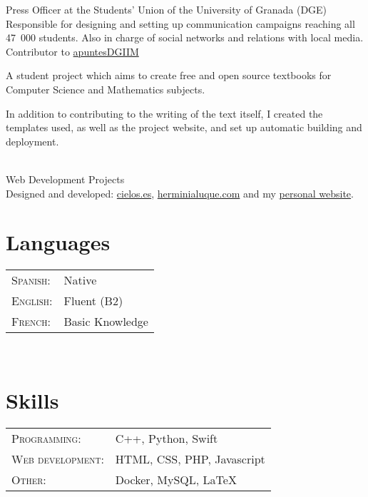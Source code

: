 \documentclass[11pt]{article} %
\begin{document}
 Press Officer at the Students' Union of the University of Granada (DGE)\\
{\color{gray} Responsible for designing and setting up communication campaigns reaching all 47~000 students. Also in charge of social networks and relations with local media.}\\

Contributor to \href{https://github.com/libreim/apuntesdgiim}{apuntesDGIIM}\\ 
{\color{gray} A student project which aims to create free and open source textbooks for Computer Science and Mathematics subjects. 

In addition to contributing to the writing of the text itself, I created the templates used, as well as the project website, and set up automatic building and deployment.}\\

Web Development Projects\\
{\color{gray} Designed and developed: \href{https://cielos.es}{cielos.es}, \href{https://herminialuque.com}{herminialuque.com} and my \href{https://jmml.me}{personal website}.}\\

\vspace{1cm}

\begin{minipage}[t]{0.5\textwidth}
	\section*{Languages}

	\begin{tabular}{@{}ll}
	\textsc{Spanish:} & Native\\

	\textsc{English:} & Fluent (B2)\\

	\textsc{French:} & Basic Knowledge\\
	\end{tabular}\\
\end{minipage}
\begin{minipage}[t]{0.5\textwidth}
	\section*{Skills}

	\begin{tabular}{@{}ll}
	\textsc{Programming:} & C++, Python, Swift\\

	\textsc{Web development:} & HTML, CSS, PHP, Javascript\\

	\textsc{Other:} & Docker, MySQL, \LaTeX\\

	\end{tabular}\\
\end{minipage}
\end{document}
